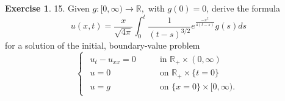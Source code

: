\documentclass[a4paper]{book}
\numberwithin{equation}{chapter}
\theoremstyle{definition}
\newtheorem{exc}[exm]{Exercise}
\begin{document}
\begin{multicols}{2}
\begin{exc}
	15.  Given $ g: [0, \infty) \rightarrow \mathbb{R}, $ with $ g(0) = 0 $, derive the formula 
	\begin{equation}\label{4:2:1}
		u(x,t) = \frac{x}{\sqrt{4\pi}} \int_{0}^{t} \frac{1}{(t-s)^{3/2}} e^{\frac{-x^2}{4(t-s)}} g(s) ds
	\end{equation}
	for a solution of the initial, boundary-value problem
	\begin{equation}\label{4:2:2}
		\begin{cases}
		\begin{aligned}
		u_t - u_{xx} = 0& \qquad \text{in } \mathbb{R}_+ \times (0,\infty) \\
		u = 0& \qquad \text{on } \mathbb{R}_+ \times \{t = 0\} \\
		u = g& \qquad \text{on } \{x = 0\} \times [0, \infty). 
		\end{aligned}
		\end{cases}
	\end{equation}
\end{exc}


\end{multicols}
\end{document}
